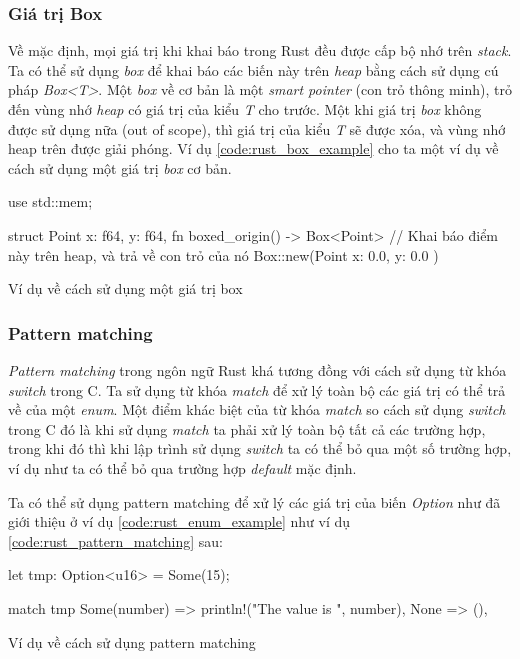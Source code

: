 \subsubsection{Giá trị Box}
Về mặc định, mọi giá trị khi khai báo trong Rust đều được cấp bộ nhớ trên \emph{stack}.
Ta có thể sử dụng \emph{box} để khai báo các biến này trên \emph{heap} bằng cách sử dụng cú pháp \emph{Box<T>}.
Một \emph{box} về cơ bản là một \emph{smart pointer} (con trỏ thông minh), trỏ đến vùng nhớ \emph{heap} có giá trị của kiểu \emph{T} cho trước.
Một khi giá trị \emph{box} không được sử dụng nữa (out of scope), thì giá trị của kiểu \emph{T} sẽ được xóa, và vùng nhớ heap trên được giải phóng.
Ví dụ \ref{code:rust_box_example} cho ta một ví dụ về cách sử dụng một giá trị \emph{box} cơ bản.

\begin{listing}
\begin{rustcode}
use std::mem;

struct Point {
    x: f64,
    y: f64,
}
fn boxed_origin() -> Box<Point> {
    // Khai báo điểm này trên heap, và trả về con trỏ của nó
    Box::new(Point { x: 0.0, y: 0.0 })
}
\end{rustcode}
\caption{Ví dụ về cách sử dụng một giá trị box}
\label{code:rust_box_example}
\end{listing}

\pagebreak
\subsubsection{Pattern matching}\label{pattern_matching}
\emph{Pattern matching} trong ngôn ngữ Rust khá tương đồng với cách sử dụng từ khóa \emph{switch} trong C.
Ta sử dụng từ khóa \emph{match} để xử lý toàn bộ các giá trị có thể trả về của một \emph{enum}.
Một điểm khác biệt của từ khóa \emph{match} so cách sử dụng \emph{switch} trong C đó là khi sử dụng \emph{match} ta phải xử lý toàn bộ tất cả các trường hợp, trong khi đó thì khi lập trình sử dụng \emph{switch} ta có thể bỏ qua một số trường hợp, ví dụ như ta có thể bỏ qua trường hợp \emph{default} mặc định.

Ta có thể sử dụng pattern matching để xử lý các giá trị của biến \emph{Option} như đã giới thiệu ở ví dụ \ref{code:rust_enum_example} như ví dụ \ref{code:rust_pattern_matching} sau:
\begin{listing}
\begin{rustcode}
let tmp: Option<u16> = Some(15);

match tmp {
  Some(number) => println!("The value is {}", number),
  None => (),
}
\end{rustcode}
\caption{Ví dụ về cách sử dụng pattern matching}
\label{code:rust_pattern_matching}
\end{listing}

